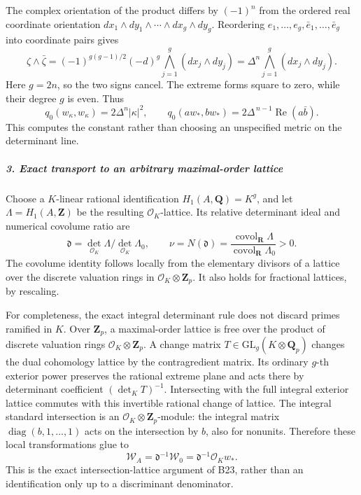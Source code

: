 The complex orientation of the product differs by \((-1)^n\) from the ordered real coordinate orientation \(dx_1\wedge dy_1\wedge\cdots\wedge dx_g\wedge dy_g\). Reordering \(e_1,\ldots,e_g,\bar e_1,\ldots,\bar e_g\) into coordinate pairs gives \[
 \zeta\wedge\bar\zeta
   =(-1)^{g(g-1)/2}(-d)^g
              \bigwedge_{j=1}^g(dx_j\wedge dy_j)
   =\Delta^n\bigwedge_{j=1}^g(dx_j\wedge dy_j).
 \tag{T24.12}
\] Here \(g=2n\), so the two signs cancel. The extreme forms square to zero, while their degree \(g\) is even. Thus \[
 q_0(w_\kappa,w_\kappa)=2\Delta^n|\kappa|^2,\qquad
 q_0(a w_*,b w_*)=
             2\Delta^{\,n-1}\operatorname{Re}(a\bar b).
 \tag{T24.13}
\] This computes the constant rather than choosing an unspecified metric on the determinant line.

\subparagraph{3. Exact transport to an arbitrary maximal-order lattice}\label{exact-transport-to-an-arbitrary-maximal-order-lattice}

Choose a \(K\)-linear rational identification \(H_1(A,\mathbf Q)=K^g\), and let \(\Lambda=H_1(A,\mathbf Z)\) be the resulting \(\mathcal O_K\)-lattice. Its relative determinant ideal and numerical covolume ratio are \[
 \mathfrak d
       =\det_{\mathcal O_K}\Lambda/
                         \det_{\mathcal O_K}\Lambda_0,\qquad
 \nu=N(\mathfrak d)
       =\frac{\operatorname{covol}_{\mathbf R}\Lambda}
              {\operatorname{covol}_{\mathbf R}\Lambda_0}>0.
 \tag{T24.14}
\] The covolume identity follows locally from the elementary divisors of a lattice over the discrete valuation rings in \(\mathcal O_K\otimes\mathbf Z_p\). It also holds for fractional lattices, by rescaling.

For completeness, the exact integral determinant rule does not discard primes ramified in \(K\). Over \(\mathbf Z_p\), a maximal-order lattice is free over the product of discrete valuation rings \(\mathcal O_K\otimes\mathbf Z_p\). A change matrix \(T\in\mathrm{GL}_g(K\otimes\mathbf Q_p)\) changes the dual cohomology lattice by the contragredient matrix. Its ordinary \(g\)-th exterior power preserves the rational extreme plane and acts there by determinant coefficient \((\det_KT)^{-1}\). Intersecting with the full integral exterior lattice commutes with this invertible rational change of lattice. The integral standard intersection is an \(\mathcal O_K\otimes\mathbf Z_p\)-module: the integral matrix \(\operatorname{diag}(b,1,\ldots,1)\) acts on the intersection by \(b\), also for nonunits. Therefore these local transformations glue to \[
 \mathscr W_A=\mathfrak d^{-1}\mathscr W_0
                 =\mathfrak d^{-1}\mathcal O_K w_*.
 \tag{T24.15}
\] This is the exact intersection-lattice argument of B23, rather than an identification only up to a discriminant denominator.


